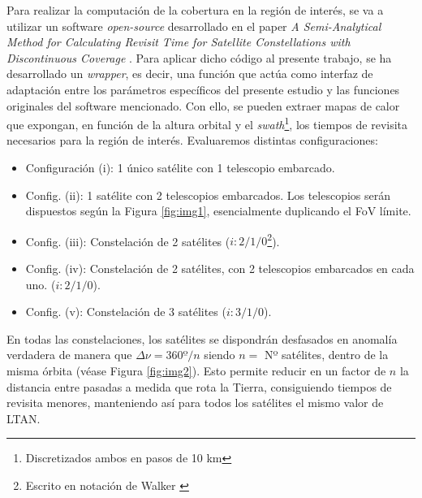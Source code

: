 Para realizar la computación de la cobertura en la región de interés, se va a utilizar un software \textit{open-source} desarrollado en el paper \textit{A Semi-Analytical Method for Calculating Revisit Time for Satellite Constellations with Discontinuous Coverage} \cite{crisp2018semi}. Para aplicar dicho código al presente trabajo, se ha desarrollado un \textit{wrapper}, es decir, una función que actúa como interfaz de adaptación entre los parámetros específicos del presente estudio y las funciones originales del software mencionado. Con ello, se pueden extraer mapas de calor que expongan, en función de la altura orbital y el \textit{swath}\footnote{Discretizados ambos en pasos de 10 km}, los tiempos de revisita necesarios para la región de interés. Evaluaremos distintas configuraciones:

\begin{itemize}
    \item Configuración (i): 1 único satélite con 1 telescopio embarcado.
    \item Config. (ii): 1 satélite con 2 telescopios embarcados. Los telescopios serán dispuestos según la Figura \ref{fig:img1}, esencialmente duplicando el FoV límite.
    \item Config. (iii): Constelación de 2 satélites ($i:2/1/0$\footnote{Escrito en notación de Walker \cite{walker1991phase}}).
    \item Config. (iv): Constelación de 2 satélites, con 2 telescopios embarcados en cada uno. ($i:2/1/0$).
    \item Config. (v): Constelación de 3 satélites ($i:3/1/0$).
\end{itemize}

En todas las constelaciones, los satélites se dispondrán desfasados en anomalía verdadera de manera que $\Delta \nu = 360º/n $ siendo $n =$ Nº satélites, dentro de la misma órbita (véase Figura \ref{fig:img2}). Esto permite reducir en un factor de $n$ la distancia entre pasadas a medida que rota la Tierra, consiguiendo tiempos de revisita menores, manteniendo así para todos los satélites el mismo valor de LTAN.

